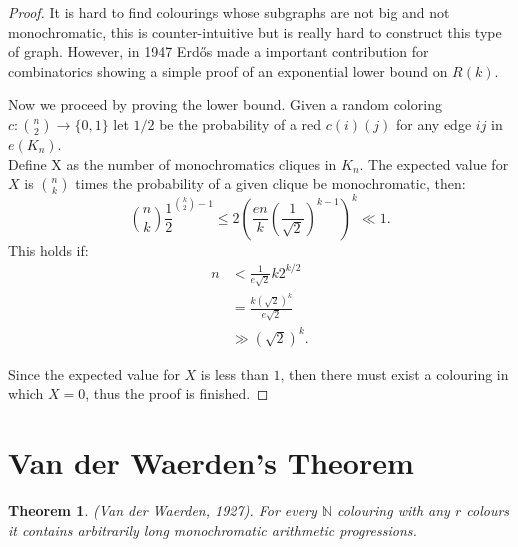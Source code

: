\documentclass[12pt,twoside,a4paper]{book}
\numberwithin{equation}{section}
\newtheorem{theorem}             {Theorem}[section]
\theoremstyle{remark}
\begin{document}
\begin{proof}
It is hard to find colourings whose subgraphs are not big and not monochromatic, this is counter-intuitive but is really hard to construct this type of graph. However, in 1947 Erd\H{o}s made a important contribution for combinatorics showing a simple proof of an exponential lower bound on $R(k)$.

Now we proceed by proving the lower bound. Given a random coloring $c\colon \binom{n}{2} \rightarrow \{0,1\}$ let $1/2$ be the probability of a red $c(i)(j)$ for any edge $ij$ in $e(K_n)$.\\ 
Define X as the number of monochromatics cliques in $K_n$. The expected value for $X$ is $\binom{n}{k}$ times the probability of a given clique be monochromatic, then:
$$\binom{n}{k}\frac{1}{2} ^{\binom{k}{2}-1} \leq 2 \left( \frac{en}{k} \left( \frac{1}{\sqrt{2}} \right)^{k-1} \right)^{k} \ll 1.$$ 
This holds if: 
\begin{align*}
n &<\frac{1}{e\sqrt{2}}k2^{k/2} \\
& = \frac{k(\sqrt{2})^{k}}{e\sqrt{2}}\\
& \gg (\sqrt{2})^k.
\end{align*}

Since the expected value for $X$ is less than $1$, then there must exist a colouring in which $X=0$, thus the proof is finished.
\end{proof}

\section{Van der Waerden's Theorem}

\begin{theorem} (Van der Waerden, 1927). For every $\mathbb{N}$ colouring with any $r$ colours it contains arbitrarily long monochromatic arithmetic progressions. 
\end{theorem}
\end{document}
